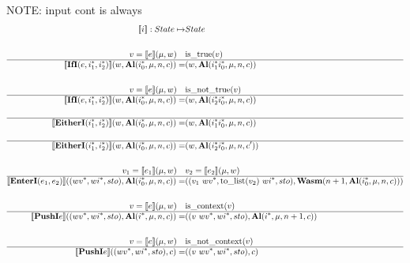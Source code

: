 NOTE: input cont is always \al
\begin{align*}
  \sem{i} : State \mapsto& State \\
%
\newline \\
  v = \sem{e}(\mu, w) \quad& \text{is\_true}(v) \\
  \hline
  \sem{\ifi (e, \seq{i_1}, \seq{i_2})}(w, \al (\seq{i_0}, \mu, n, c))
  =&
  (w, \al (\seq{i_1} \seq{i_0}, \mu, n, c)) \\
%
\newline \\
  v = \sem{e}(\mu, w) \quad& \text{is\_not\_true}(v) \\
  \hline
  \sem{\ifi (e, \seq{i_1}, \seq{i_2})}(w, \al (\seq{i_0}, \mu, n, c))
  =&
  (w, \al (\seq{i_2} \seq{i_0}, \mu, n, c)) \\
%
\newline \\
  \hline
  \sem{\eitheri (\seq{i_1}, \seq{i_2})}(w, \al (\seq{i_0}, \mu, n, c))
  =&
  (w, \al (\seq{i_1} \seq{i_0}, \mu, n, c)) \\
%
\newline \\
  \hline
  \sem{\eitheri (\seq{i_1}, \seq{i_2})}(w, \al (\seq{i_0}, \mu, n, c))
  =&
  (w, \al (\seq{i_2} \seq{i_0}, \mu, n, c')) \\
%
\newline \\
  v_1 = \sem{e_1}(\mu, w) \quad& v_2 = \sem{e_2}(\mu, w) \\
  \hline
  \sem{\enteri (e_1, e_2)}((\seq{wv}, \seq{wi}, sto), \al (\seq{i_0}, \mu, n, c))
  =&
  ((v_1 ~ \seq{wv}, \text{to\_list}(v_2) ~ \seq{wi}, sto), \wasm (n+1, \al (\seq{i_0}, \mu, n, c))) \\
%
\newline \\
  v = \sem{e}(\mu, w) \quad& \text{is\_context}(v) \\
  \hline
  \sem{\pushi e}((\seq{wv}, \seq{wi}, sto), \al(\seq i, \mu, n, c))
  =&
  ((v ~ \seq{wv}, \seq{wi}, sto), \al(\seq i, \mu, n+1, c)) \\
%
\newline \\
  v = \sem{e}(\mu, w) \quad& \text{is\_not\_context}(v) \\
  \hline
  \sem{\pushi e}((\seq{wv}, \seq{wi}, sto), c) =& ((v ~ \seq{wv}, \seq{wi}, sto), c) \\

\end{align*}
